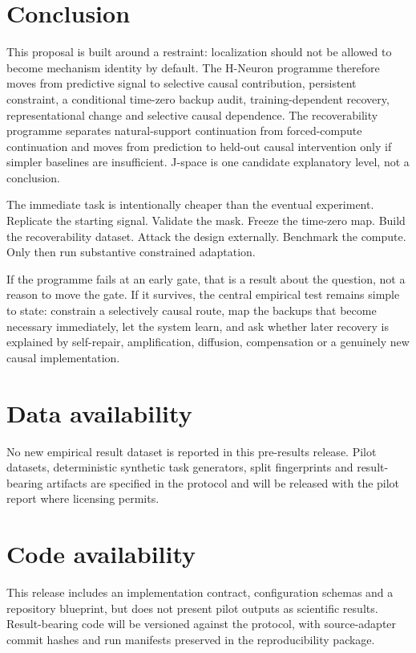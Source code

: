 \documentclass[11pt,a4paper]{article}
\begin{document}
\clearpage
\tableofcontents
\clearpage



\section{Conclusion}
This proposal is built around a restraint: localization should not be allowed to become mechanism identity by default. The H-Neuron programme therefore moves from predictive signal to selective causal contribution, persistent constraint, a conditional time-zero backup audit, training-dependent recovery, representational change and selective causal dependence. The recoverability programme separates natural-support continuation from forced-compute continuation and moves from prediction to held-out causal intervention only if simpler baselines are insufficient. J-space is one candidate explanatory level, not a conclusion.

The immediate task is intentionally cheaper than the eventual experiment. Replicate the starting signal. Validate the mask. Freeze the time-zero map. Build the recoverability dataset. Attack the design externally. Benchmark the compute. Only then run substantive constrained adaptation.

If the programme fails at an early gate, that is a result about the question, not a reason to move the gate. If it survives, the central empirical test remains simple to state: constrain a selectively causal route, map the backups that become necessary immediately, let the system learn, and ask whether later recovery is explained by self-repair, amplification, diffusion, compensation or a genuinely new causal implementation.

\section*{Data availability}
No new empirical result dataset is reported in this pre-results release. Pilot datasets, deterministic synthetic task generators, split fingerprints and result-bearing artifacts are specified in the protocol and will be released with the pilot report where licensing permits.

\section*{Code availability}
This release includes an implementation contract, configuration schemas and a repository blueprint, but does not present pilot outputs as scientific results. Result-bearing code will be versioned against the protocol, with source-adapter commit hashes and run manifests preserved in the reproducibility package.
\end{document}
